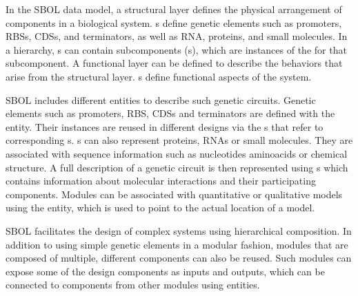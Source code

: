 In the SBOL data model, a structural layer defines the physical arrangement of components in a biological system.  s define genetic elements such as promoters, RBSs, CDSs, and terminators, as well as RNA, proteins, and small molecules.  In a hierarchy, s can contain subcomponents (s), which are instances of the  for that subcomponent.  A functional layer can be defined to describe the behaviors that arise from the structural layer.  s define functional aspects of the system.  


SBOL includes different entities to describe such genetic circuits. Genetic elements such as promoters, RBS, CDSs and terminators are defined with the  entity. Their instances are reused in different designs via the s that refer to corresponding s. s can also represent proteins, RNAs or small molecules. They are associated with sequence information such as nucleotides aminoacids or chemical structure. A full description of a genetic circuit is then represented using  s which contains information about molecular interactions and their participating components. Modules can be associated with quantitative or qualitative models using the  entity, which is used to point to the actual location of a model.


SBOL facilitates the design of complex systems using hierarchical composition. In addition to using simple genetic elements in a modular fashion, modules that are composed of multiple, different components can also be reused. Such modules can expose some of the design components as inputs and outputs, which can be connected to components from other modules using  entities.




